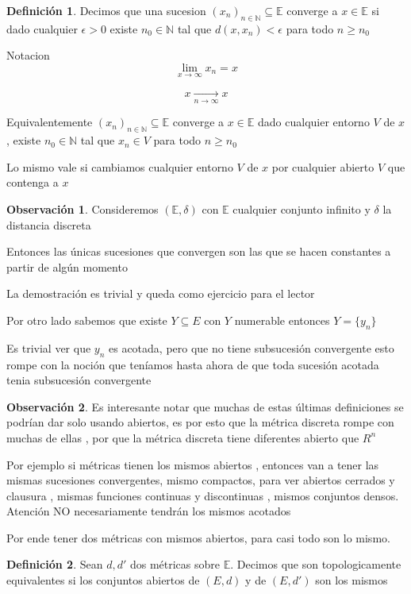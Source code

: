 \documentclass[12pt]{article}
\newcommand{\E}{\mathbb{E}}
\newcommand{\N}{\mathbb{N}}
\newcommand{\ra}{\rightarrow}
\theoremstyle{definition}
\newtheorem{definition}{Definición}[section]
\newtheorem*{remark}{Observación}
\begin{document}
\begin{definition}
  Decimos que una sucesion $(x_{n})_{n \in \N} \subseteq \E$ converge a $x \in \E$ si dado cualquier $\epsilon > 0$ existe $n_{0} \in \N$ tal que $d(x,x_{n}) < \epsilon$ para todo $n \geq n_{0}$

  Notacion $$ \lim_{x \ra \infty} x_{n} = x$$

  $$ x \xrightarrow[n \ra \infty]{} x$$

  Equivalentemente $(x_{n})_{n \in \N} \subseteq \E$ converge a $x \in \E$ dado cualquier entorno $V$ de $x$, existe $n_{0} \in \N $ tal que $x_{n} \in V$ para todo $n \geq n_{0}$

  Lo mismo vale si cambiamos cualquier entorno $V$ de $x$ por cualquier abierto $V$ que contenga a $x$
\end{definition}

\begin{remark}
Consideremos $(\E,\delta)$ con $\E$ cualquier conjunto infinito y $\delta$ la distancia discreta

Entonces las únicas sucesiones que convergen son las que se hacen constantes a partir de algún momento

La demostración es trivial y queda como ejercicio para el lector

Por otro lado sabemos que existe $Y \subseteq  E$ con $Y$ numerable entonces $Y = \{ y_{n}\}$ 

Es trivial ver que $y_{n}$ es acotada, pero que no tiene subsucesión convergente esto rompe con la noción que teníamos hasta ahora de que toda sucesión acotada tenia subsucesión convergente 
\end{remark}

\begin{remark}
  Es interesante notar que muchas de estas últimas definiciones se podrían dar solo usando abiertos, es por esto que la métrica discreta rompe con muchas de ellas , por que la métrica discreta tiene diferentes abierto que $R^n$

  Por ejemplo si métricas tienen los mismos abiertos , entonces van a tener las mismas sucesiones convergentes, mismo compactos, para ver abiertos cerrados y clausura , mismas funciones continuas y discontinuas , mismos conjuntos densos. Atención NO necesariamente tendrán los mismos acotados
 
  Por ende tener dos métricas con mismos abiertos, para casi todo son lo mismo.
\end{remark}


\begin{definition}
  Sean $d,d'$ dos métricas sobre $\E$. Decimos que son topologicamente equivalentes si los conjuntos abiertos de $(E,d)$ y de $(E,d')$ son los mismos    
\end{definition}
\end{document}
